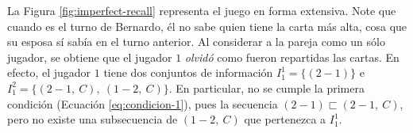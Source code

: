 La Figura \ref{fig:imperfect-recall} representa el juego en forma extensiva. 
 Note que cuando es el turno de Bernardo, él no sabe quien tiene la carta más alta, cosa que su esposa sí sabía en el turno anterior. Al considerar a la pareja como un sólo jugador, se obtiene que el jugador $1$ \textit{olvidó} como fueron repartidas las cartas. En efecto, el jugador $1$ tiene dos conjuntos de información $I^1_1 = \{(2-1) \}$ e $I^2_1 = \{(2-1,\ C),\ (1-2,\ C) \}$. En particular, no se cumple la primera condición (Ecuación \ref{eq:condicion-1}), pues la secuencia $(2-1) \sqsubset (2-1,\ C)$, pero no existe una subsecuencia de $(1-2,\ C)$ que pertenezca a $I^1_1$.

